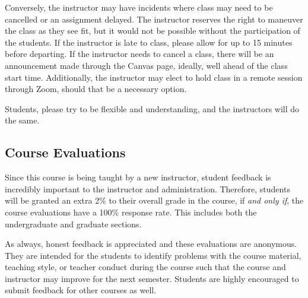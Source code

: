 \documentclass[
	letterpaper, %
	fontsize=10pt, %
	twoside=true, %
	numbers=noenddot, %
]{kaobook}
\begin{document}
Conversely, the instructor may have incidents where class may need to be cancelled or an assignment delayed. The instructor reserves the right to maneuver the class as they see fit, but it would not be possible without the participation of the students.
If the instructor is late to class, please allow for up to 15 minutes before departing.
If the instructor needs to cancel a class, there will be an announcement made through the Canvas page, ideally, well ahead of the class start time.
Additionally, the instructor may elect to hold class in a remote session through Zoom, should that be a necessary option.

Students, please try to be flexible and understanding, and the instructors will do the same.

\subsection*{Course Evaluations} \label{ssec:course_evals}
Since this course is being taught by a new instructor, student feedback is incredibly important to the instructor and administration.
Therefore, students will be granted an extra 2\% to their overall grade in the course, if \emph{and only if}, the course evaluations have a 100\% response rate.
This includes both the undergraduate and graduate sections.

As always, honest feedback is appreciated and these evaluations are anonymous.
They are intended for the students to identify problems with the course material, teaching style, or teacher conduct during the course such that the course and instructor may improve for the next semester.
Students are highly encouraged to submit feedback for other courses as well. 
\end{document}
